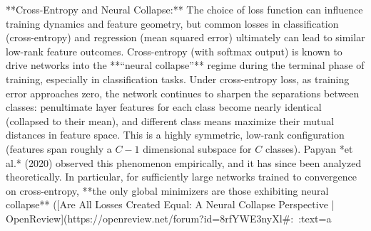 **Cross-Entropy and Neural Collapse:** The choice of loss function can influence training dynamics and feature geometry, but common losses in classification (cross-entropy) and regression (mean squared error) ultimately can lead to similar low-rank feature outcomes. Cross-entropy (with softmax output) is known to drive networks into the **“neural collapse”** regime during the terminal phase of training, especially in classification tasks. Under cross-entropy loss, as training error approaches zero, the network continues to sharpen the separations between classes: penultimate layer features for each class become nearly identical (collapsed to their mean), and different class means maximize their mutual distances in feature space. This is a highly symmetric, low-rank configuration (features span roughly a $C-1$ dimensional subspace for $C$ classes). Papyan *et al.* (2020) observed this phenomenon empirically, and it has since been analyzed theoretically. In particular, for sufficiently large networks trained to convergence on cross-entropy, **the only global minimizers are those exhibiting neural collapse** ([Are All Losses Created Equal: A Neural Collapse Perspective | OpenReview](https://openreview.net/forum?id=8rfYWE3nyXl#:~:text=a%

